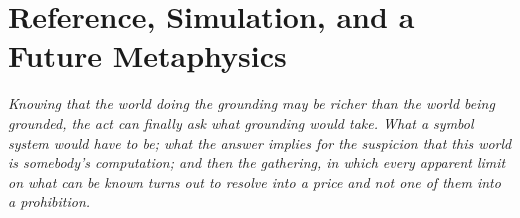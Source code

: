 \documentclass[12pt,openright,twoside]{book}
\theoremstyle{remark}
\theoremstyle{plain}
\theoremstyle{remark}
\theoremstyle{plain}
\theoremstyle{plain}
\begin{document}
\bigskip


\part{Reference, Simulation, and a Future Metaphysics}
\label{part:reference}

\vspace{1em}
\begin{mdframed}[backgroundcolor=remarkgray, linecolor=gray!60,
                 linewidth=1pt, topline=false, rightline=false,
                 bottomline=false]
\small\itshape
Knowing that the world doing the grounding may be richer than the world
being grounded, the act can finally ask what grounding would take.
What a symbol system would have to be; what the answer implies for the
suspicion that this world is somebody's computation; and then the
gathering, in which every apparent limit on what can be known turns out
to resolve into a price and not one of them into a prohibition.
\end{mdframed}

\bigskip




\cleardoublepage
{}
{}
\end{document}
